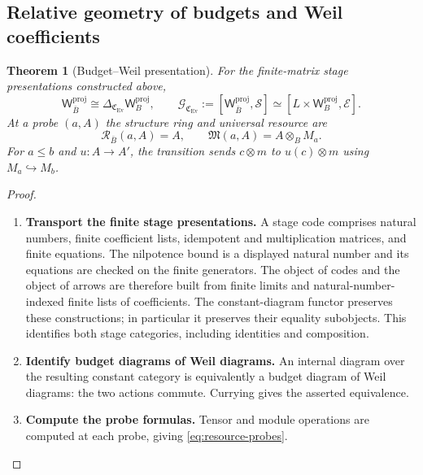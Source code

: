 \documentclass[11pt,a4paper]{article}
\numberwithin{algorithm}{section}
\numberwithin{equation}{section}
\newtheorem{theorem}{Theorem}[section]
\theoremstyle{definition}
\theoremstyle{remark}
\theoremstyle{plain}
\newcommand{\E}{\mathcal E}
\newcommand{\incl}{\hookrightarrow}
\newcommand{\Ev}{{\operatorname{Ev}}}
\newcommand{\Weil}{\mathsf W}
\newcommand{\Cplx}{\mathfrak C_{\Ev}}
\theoremstyle{definition}
\theoremstyle{plain}
\begin{document}
\subsection{Relative geometry of budgets and Weil coefficients}
\label{sec:relative-probes}
\begin{theorem}[Budget--Weil presentation]
\label{thm:budget-weil}
For the finite-matrix stage presentations constructed above,
\[
 \Weil_{\bar B}^{\mathrm{proj}}
       \cong\Delta_{\Cplx}\Weil_B^{\mathrm{proj}},\qquad
 \mathcal G_{\Cplx}:=[\Weil_{\bar B}^{\mathrm{proj}},\mathscr S]
       \simeq[L\times\Weil_B^{\mathrm{proj}},\E].
\]
At a probe $(a,A)$ the structure ring and universal resource are
\begin{equation}\label{eq:resource-probes}
 \mathcal R_{\bar B}(a,A)=A,\qquad
 \mathfrak M(a,A)=A\otimes_BM_a.
\end{equation}
For $a\le b$ and $u:A\to A'$, the transition sends
$c\otimes m$ to $u(c)\otimes m$ using $M_a\incl M_b$.
\end{theorem}
\begin{proof}\leavevmode
\begin{enumerate}[leftmargin=*,align=left]
\item \textbf{Transport the finite stage presentations.}
A stage code comprises natural numbers, finite coefficient lists,
idempotent and multiplication matrices, and finite equations.
The nilpotence bound is a displayed natural number and its
equations are checked on the finite generators. The object of
codes and the object of arrows are therefore built from finite
limits and natural-number-indexed finite lists of coefficients.
The constant-diagram functor preserves these constructions;
in particular it preserves their equality subobjects. This identifies both
stage categories, including identities and composition.

\item \textbf{Identify budget diagrams of Weil diagrams.}
An internal diagram over the resulting constant category is
equivalently a budget diagram of Weil diagrams: the two actions
commute. Currying gives the asserted equivalence.

\item \textbf{Compute the probe formulas.}
Tensor and
module operations are computed at each probe, giving
\eqref{eq:resource-probes}.
\end{enumerate}
\end{proof}
\end{document}
